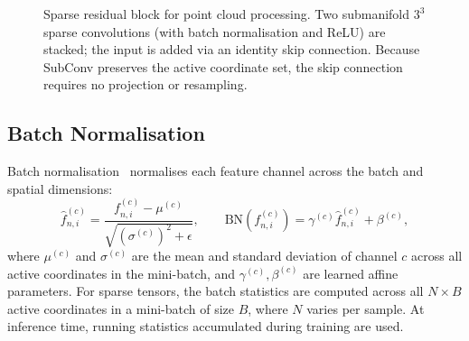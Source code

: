 \begin{figure}[t]
\centering
{}
\caption{%
  Sparse residual block for point cloud processing.
  Two submanifold $3^3$ sparse convolutions (with batch normalisation and ReLU)
  are stacked; the input is added via an identity skip connection.
  Because SubConv preserves the active coordinate set, the skip connection
  requires no projection or resampling.
}
\label{fig:resblock}
\end{figure}

\subsection{Batch Normalisation}
\label{ssec:batch-norm}

Batch normalisation~\cite{ioffe2015batch} normalises each feature channel
across the batch and spatial dimensions:
\begin{equation}
  \hat{f}^{(c)}_{n,i} = \frac{f^{(c)}_{n,i} - \mu^{(c)}}{\sqrt{(\sigma^{(c)})^2 + \epsilon}},
  \qquad
  \text{BN}(f^{(c)}_{n,i}) = \gamma^{(c)} \hat{f}^{(c)}_{n,i} + \beta^{(c)},
\end{equation}
where $\mu^{(c)}$ and $\sigma^{(c)}$ are the mean and standard deviation of
channel $c$ across all active coordinates in the mini-batch, and
$\gamma^{(c)}, \beta^{(c)}$ are learned affine parameters.
For sparse tensors, the batch statistics are computed across all $N \times B$
active coordinates in a mini-batch of size $B$, where $N$ varies per sample.
At inference time, running statistics accumulated during training are used.

